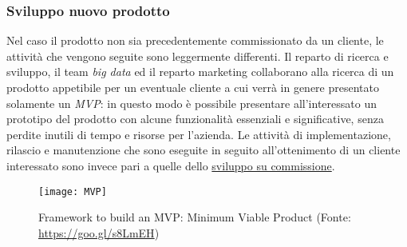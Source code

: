 \subsubsection{Sviluppo nuovo prodotto}
Nel caso il prodotto non sia precedentemente commissionato da un cliente, le attività che vengono seguite sono leggermente differenti. Il reparto di ricerca e sviluppo, il team \textit{big data} ed il reparto marketing collaborano alla ricerca di un prodotto appetibile per un eventuale cliente a cui verrà in genere presentato solamente un \textit{\gls{MVP}}: in questo modo è possibile presentare all'interessato un prototipo del prodotto con alcune funzionalità essenziali e significative, senza perdite inutili di tempo e risorse per l'azienda. Le attività di implementazione, rilascio e manutenzione che sono eseguite in seguito all'ottenimento di un cliente interessato sono invece pari a quelle dello \hyperref[commissione]{sviluppo su commissione}.
\begin{figure}[!h] 
	\centering 
	\texttt{[image: MVP]}
	\caption{Framework to build an MVP: Minimum Viable Product (Fonte: \href{https://goo.gl/s8LmEH}{https://goo.gl/s8LmEH})}
\end{figure}

